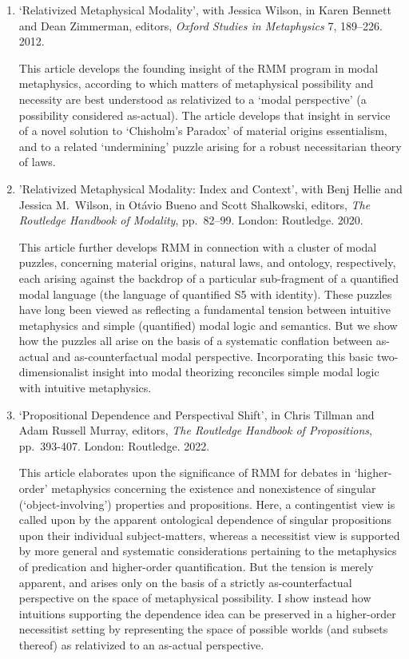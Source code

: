 \documentclass[12pt]{article}
\begin{document}
\begin{enumerate}	

\item `Relativized Metaphysical Modality', with Jessica Wilson, in Karen Bennett
and Dean Zimmerman, editors, \emph{Oxford Studies in Metaphysics} 7, 189--226. 2012. 

\noindent This article develops the founding insight of the RMM program in
modal metaphysics, according to which matters of metaphysical possibility and
necessity are best understood as relativized to a `modal perspective' (a
possibility considered as-actual). The article develops that insight in
service of a novel solution to `Chisholm's Paradox' of material origins
essentialism, and to a related `undermining' puzzle arising for
a robust necessitarian theory of laws.  

\item 'Relativized Metaphysical Modality: Index and Context', with Benj Hellie
and Jessica M.\ Wilson, in Ot\'avio Bueno and Scott Shalkowski, editors,
\emph{The Routledge Handbook of Modality}, pp.~82--99. London: Routledge.
2020.

This article further develops RMM in connection with 
a cluster of modal puzzles, concerning material origins, natural laws, and
ontology, respectively, 
each arising against the backdrop of a particular
sub-fragment of a quantified modal language (the language of quantified S5
with identity). These puzzles have long been viewed as reflecting a
fundamental tension between intuitive metaphysics and simple 
(quantified) modal logic and semantics. But we show how the puzzles all arise
on the basis of a systematic conflation between as-actual and
as-counterfactual modal perspective. Incorporating this basic
two-dimensionalist insight into modal theorizing reconciles 
simple modal logic with intuitive metaphysics.  

\item `Propositional Dependence and Perspectival Shift', in Chris
Tillman and Adam Russell Murray, editors, \emph{The Routledge Handbook of
Propositions}, pp.\ 393-407. London: Routledge. 2022.  

\noindent This article elaborates upon the significance of RMM for 
debates in `higher-order' metaphysics concerning the existence and
nonexistence of 
singular (`object-involving') properties and propositions. Here, a
contingentist view is called upon by the apparent ontological dependence of
singular propositions upon their individual subject-matters, whereas a  
necessitist view is supported by more general and systematic considerations pertaining to the 
metaphysics of predication and higher-order quantification. But the tension is
merely apparent, and arises only on the basis of a strictly as-counterfactual
perspective on the space of metaphysical possibility. I show instead how intuitions 
supporting the dependence idea can be preserved in a higher-order necessitist
setting by representing the space of possible worlds (and subsets thereof) as
relativized to an as-actual perspective. 

\end{enumerate}
\end{document}
